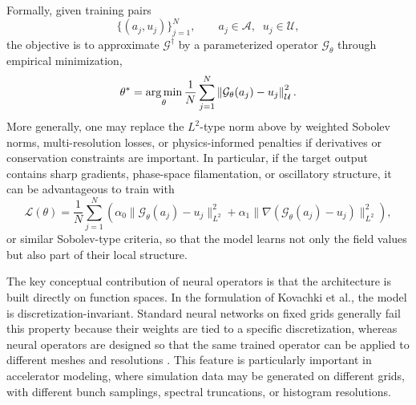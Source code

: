 \documentclass[11pt,a4paper]{article}
\begin{document}
\begin{sloppypar}
Formally, given training pairs
\begin{equation}
\{(a_j,u_j)\}_{j=1}^{N},
\qquad
a_j \in \mathcal A,\;\; u_j \in \mathcal U,
\end{equation}
the objective is to approximate \(\mathcal G^\dagger\) by a parameterized operator \(\mathcal G_\theta\) through empirical minimization,
\begin{equation}
\theta^* = \operatorname*{arg\,min}_{\theta}
\frac{1}{N}
\sum_{j=1}^{N}
\left\|
\mathcal G_{\theta}(a_j)-u_j
\right\|_{\mathcal U}^{2}.
\label{eq:NO_training}
\end{equation}
More generally, one may replace the \(L^2\)-type norm above by weighted Sobolev norms, multi-resolution losses, or physics-informed penalties if derivatives or conservation constraints are important. In particular, if the target output contains sharp gradients, phase-space filamentation, or oscillatory structure, it can be advantageous to train with
\begin{equation}
\mathcal L(\theta)
=
\frac{1}{N}\sum_{j=1}^{N}
\left(
\alpha_0 \| \mathcal G_\theta(a_j)-u_j\|_{L^2}^2
+
\alpha_1 \|\nabla(\mathcal G_\theta(a_j)-u_j)\|_{L^2}^2
\right),
\label{eq:NO_sobolev_loss}
\end{equation}
or similar Sobolev-type criteria, so that the model learns not only the field values but also part of their local structure.

The key conceptual contribution of neural operators is that the architecture is built directly on function spaces. In the formulation of Kovachki et al., the model is discretization-invariant. Standard neural networks on fixed grids generally fail this property because their weights are tied to a specific discretization, whereas neural operators are designed so that the same trained operator can be applied to different meshes and resolutions \cite{kovachki_neural_nodate}. This feature is particularly important in accelerator modeling, where simulation data may be generated on different grids, with different bunch samplings, spectral truncations, or histogram resolutions.


\end{sloppypar}
\end{document}
